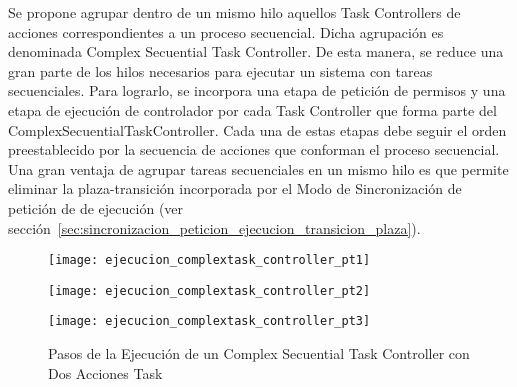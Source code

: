 Se propone agrupar dentro de un mismo hilo aquellos Task Controllers de acciones
correspondientes a un proceso secuencial. Dicha agrupación es denominada
Complex Secuential Task Controller. De esta manera, se reduce una gran parte de
los hilos necesarios para ejecutar un sistema con tareas secuenciales.
Para lograrlo, se incorpora una etapa de petición de permisos y una etapa de
ejecución de controlador por cada Task Controller que forma parte del
ComplexSecuentialTaskController. Cada una de estas etapas debe seguir el orden
preestablecido por la secuencia de acciones que conforman el proceso secuencial.
Una gran ventaja de agrupar tareas
secuenciales en un mismo hilo es que permite eliminar la plaza-transición incorporada por el Modo de
Sincronización de petición de de ejecución (ver
sección~\ref{sec:sincronizacion_peticion_ejecucion_transicion_plaza}).

\begin{figure}[H]
	\centering
	\texttt{[image: ejecucion\_complextask\_controller\_pt1]}
\end{figure}

\begin{figure}[H]
	\centering
	\texttt{[image: ejecucion\_complextask\_controller\_pt2]}
\end{figure}

\begin{figure}[H]
	\centering
	\texttt{[image: ejecucion\_complextask\_controller\_pt3]}
	\caption{Pasos de la Ejecución de un Complex Secuential Task Controller con
	Dos Acciones Task}
	\label{fig:ejecucion_complextask_controller}
\end{figure}